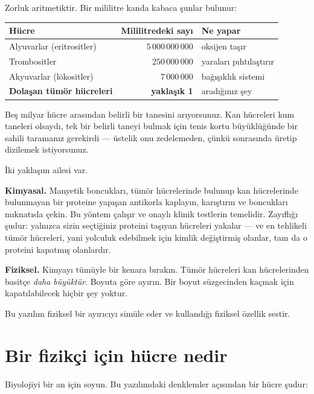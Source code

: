 \documentclass[11pt,a4paper]{article}
\begin{document}
Zorluk aritmetiktir. Bir mililitre kanda kabaca şunlar bulunur:

\begin{center}
\small
\begin{tabular}{lrl}
\toprule
\textbf{Hücre} & \textbf{Mililitredeki sayı} & \textbf{Ne yapar} \\
\midrule
Alyuvarlar (eritrositler) & $5\,000\,000\,000$ & oksijen taşır \\
Trombositler             & $250\,000\,000$    & yaraları pıhtılaştırır \\
Akyuvarlar (lökositler)  & $7\,000\,000$      & bağışıklık sistemi \\
\textbf{Dolaşan tümör hücreleri} & \textbf{yaklaşık 1} & aradığınız şey \\
\bottomrule
\end{tabular}
\end{center}

\begin{plain}
Beş milyar hücre arasından belirli bir tanesini arıyorsunuz. Kan hücreleri kum
taneleri olsaydı, tek bir belirli taneyi bulmak için tenis kortu büyüklüğünde
bir sahili taramanız gerekirdi --- üstelik onu zedelemeden, çünkü sonrasında
üretip dizilemek istiyorsunuz.
\end{plain}

İki yaklaşım ailesi var.

\textbf{Kimyasal.} Manyetik boncukları, tümör hücrelerinde bulunup kan
hücrelerinde bulunmayan bir proteine yapışan antikorla kaplayın, karıştırın ve
boncukları mıknatısla çekin. Bu yöntem çalışır ve onaylı klinik testlerin
temelidir. Zayıflığı şudur: yalnızca sizin seçtiğiniz proteini taşıyan hücreleri
yakalar --- ve en tehlikeli tümör hücreleri, yani yolculuk edebilmek için kimlik
değiştirmiş olanlar, tam da o proteini kapatmış olanlardır.

\textbf{Fiziksel.} Kimyayı tümüyle bir kenara bırakın. Tümör hücreleri kan
hücrelerinden basitçe \emph{daha büyüktür}. Boyuta göre ayırın. Bir boyut
süzgecinden kaçmak için kapatılabilecek hiçbir şey yoktur.

Bu yazılım fiziksel bir ayırıcıyı simüle eder ve kullandığı fiziksel özellik
sestir.

\section{Bir fizikçi için hücre nedir}

Biyolojiyi bir an için soyun. Bu yazılımdaki denklemler açısından bir hücre
şudur:
\end{document}
